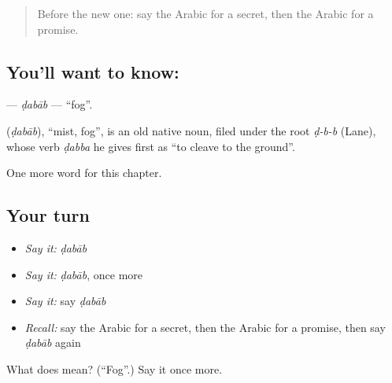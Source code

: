 \begin{quote}
Before the new one: say the Arabic for a secret, then the Arabic for a promise.
\end{quote}

\subsection*{You'll want to know: }
\textbf{} — \emph{ḍabāb} — \textquotedblleft{}fog\textquotedblright{}.

\begin{cousinweb}
\textbf{} (\emph{ḍabāb}), \textquotedblleft{}mist, fog\textquotedblright{}, is an old native noun, filed under the root \emph{ḍ-b-b} (Lane), whose verb \emph{ḍabba} he gives first as \textquotedblleft{}to cleave to the ground\textquotedblright{}.
\end{cousinweb}

\begin{grammarlens}[title={What you've built}]
One more word for this chapter.
\end{grammarlens}

\subsection*{Your turn}
\begin{itemize}
\raggedright
  \item \emph{Say it:} \emph{ḍabāb}
  \item \emph{Say it:} \emph{ḍabāb}, once more
  \item \emph{Say it:} say \emph{ḍabāb}
  \item \emph{Recall:} say the Arabic for a secret, then the Arabic for a promise, then say \emph{ḍabāb} again
\end{itemize}

\begin{tcolorbox}[breakable,colback=teal!4,colframe=teal!35!black,title={Before you move on}]
What does  mean? (\textquotedblleft{}Fog\textquotedblright{}.) Say it once more.
\end{tcolorbox}
